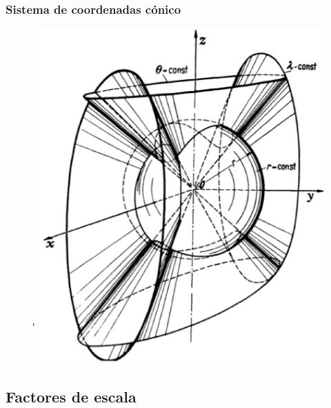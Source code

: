 \begin{frame}
\frametitle{Sistema de coordenadas cónico}
\begin{figure}
   \centering
   \includegraphics[scale=0.3]{Imagenes/Sistema_Conico.eps}
\end{figure}
\end{frame}

\subsection{Factores de escala}

